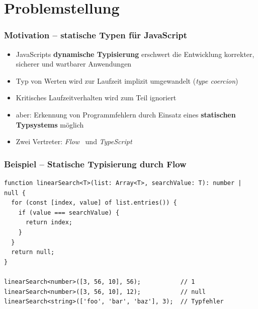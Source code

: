 




  \section{Problemstellung}

    \begin{frame}
      \frametitle{Motivation -- statische Typen für JavaScript}
      \begin{itemize}
        \item JavaScripts \textbf{dynamische Typisierung} erschwert die Entwicklung korrekter, sicherer und wartbarer Anwendungen~\autocite{NIKHIL:2014,PRADEL:2015,BIERMAN:2014}
        \item Typ von Werten wird zur Laufzeit implizit umgewandelt (\textit{type coercion})
        \item Kritisches Laufzeitverhalten wird zum Teil ignoriert
        \item aber: Erkennung von Programmfehlern durch Einsatz eines \textbf{statischen Typsystems} möglich
        \item Zwei Vertreter: \textit{Flow}~\autocite{FLOW:PAPER} und \textit{TypeScript}~\autocite{TYPESCRIPT:SPEC}
      \end{itemize}
    \end{frame}

    \begin{frame}[fragile]
      \frametitle{Beispiel -- Statische Typisierung durch Flow}
      \begin{lstlisting}
function linearSearch<T>(list: Array<T>, searchValue: T): number | null {
  for (const [index, value] of list.entries()) {
    if (value === searchValue) {
      return index;
    }
  }
  return null;
}

linearSearch<number>([3, 56, 10], 56);           // 1
linearSearch<number>([3, 56, 10], 12);           // null
linearSearch<string>(['foo', 'bar', 'baz'], 3);  // Typfehler
      \end{lstlisting}
    \end{frame}

